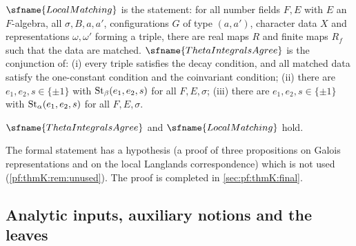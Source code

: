 \begin{definition}\label{pf:thmK:def:K}
$\sfname{LocalMatching}$ is the statement: for all number fields $F,E$ with $E$ an $F$-algebra, all $\sigma,B,a,a'$,
configurations $G$ of type $(a,a')$, character data $X$ and representations $\omega,\omega'$ forming a triple, there are
real maps $R$ and finite maps $R_f$ such that the data are matched. $\sfname{ThetaIntegralsAgree}$ is the conjunction of:
(i) every triple satisfies the decay condition, and all matched data satisfy the one-constant condition and the
coinvariant condition; (ii) there are $e_1,e_2,s\in\{\pm1\}$ with $\operatorname{St}_\beta(e_1,e_2,s)$ for all $F,E,\sigma$; (iii)
there are $e_1,e_2,s\in\{\pm1\}$ with $\operatorname{St}_\alpha(e_1,e_2,s)$ for all $F,E,\sigma$.
\end{definition}

\begin{theorem}\label{pf:thmK:main}
$\sfname{ThetaIntegralsAgree}$ and $\sfname{LocalMatching}$ hold.
\end{theorem}

The formal statement has a hypothesis (a proof of three propositions on Galois representations and on the local Langlands
correspondence) which is not used (\cref{pf:thmK:rem:unused}). The proof is completed in \cref{sec:pf:thmK:final}.


\subsection{Analytic inputs, auxiliary notions and the leaves}\label{sec:pf:thmK:inputs}

